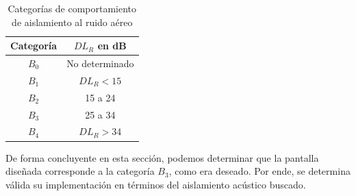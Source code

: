 \begin{table}[H]
\setlength\arrayrulewidth{1pt}
    \centering
    \begin{tabular}{|c|c|} \hline
        \textbf{Categoría} & \textbf{$DL_R$ en dB} \\ \hline \hline
         $B_0$ & No determinado \\ \hline
         $B_1$ & $DL_R < 15$  \\ \hline
         $B_2$ & 15 a 24 \\ \hline
         $B_3$ & 25 a 34 \\ \hline
         $B_4$ & $DL_R > 34$ \\ \hline
    \end{tabular}
    \caption{Categorías de comportamiento de aislamiento al ruido aéreo}
    \label{tab:categorias_aislamiento}
\end{table}


\par De forma concluyente en esta sección, podemos determinar que la pantalla diseñada  corresponde a la categoría $B_3$, como era deseado. Por ende, se determina válida su implementación en términos del aislamiento acústico buscado. 
